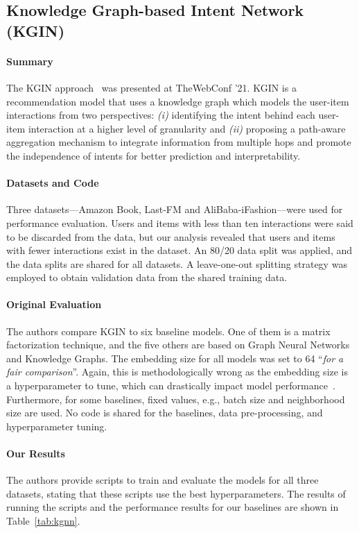 \documentclass[sigconf,natbib=true,nonacm]{acmart}
\begin{document}
\subsection{Knowledge Graph-based Intent Network (KGIN)}
\label{sec:KGIN}
\paragraph{Summary}
The KGIN approach~\cite{wang2021learning} was presented at TheWebConf '21. KGIN is a recommendation model that uses a knowledge graph which models the user-item interactions from two perspectives: \emph{(i)} identifying the intent behind each user-item interaction at a higher level of granularity and \emph{(ii)} proposing a path-aware aggregation mechanism to integrate information from multiple hops and promote the independence of intents for better prediction and interpretability.


\paragraph{Datasets and Code} Three datasets---Amazon Book, Last-FM and AliBaba-iFashion---were used for performance evaluation. Users and items with less than ten interactions were said to be discarded from the data, but our analysis revealed that users and items with fewer interactions exist in the dataset. An 80/20 data split was applied, and the data splits are shared for all datasets. A leave-one-out splitting strategy was employed to obtain validation data from the shared training data.

\paragraph{Original Evaluation} The authors compare KGIN to six baseline models. One of them is a matrix factorization technique, and the five others are based on Graph Neural Networks and Knowledge Graphs. The embedding size for all models was set to 64 ``\emph{for a fair comparison}''. Again, this is methodologically wrong as the embedding size is a hyperparameter to tune, which can drastically impact model performance~\cite{shehzad2024performance}. Furthermore, for some baselines, fixed values, e.g., batch size and neighborhood size are used. No code is shared for the baselines, data pre-processing, and hyperparameter tuning.

\paragraph{Our Results} The authors provide scripts to train and evaluate the models for all three datasets, stating that these scripts use the best hyperparameters. The results of running the scripts and the performance results for our baselines are shown in Table~\ref{tab:kgnn}.
\end{document}
